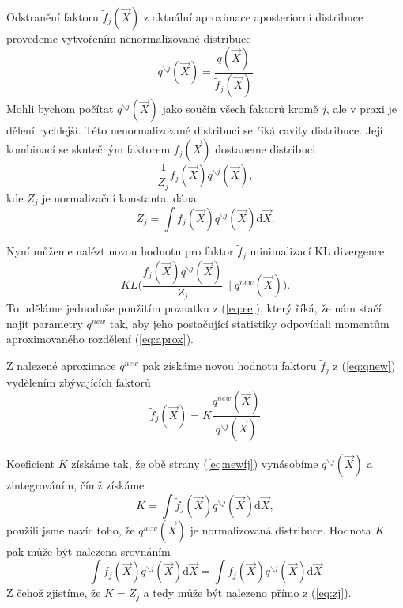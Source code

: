 Odstranění faktoru $\tilde{f}_j(\vec{X})$ z aktuální aproximace aposteriorní distribuce provedeme vytvořením nenormalizované distribuce
\begin{equation}
q^{\backslash j}(\vec{X}) = \frac{q(\vec{X})}{\tilde{f}_j(\vec{X})}
\end{equation}
Mohli bychom počítat $q^{\backslash j}(\vec{X})$ jako součin všech faktorů kromě $j$, ale v praxi je dělení rychlejší.
Této nenormalizované distribuci se říká cavity distribuce.
Její kombinací se skutečným faktorem $f_j(\vec{X})$ dostaneme distribuci
\begin{equation}
    \frac{1}{Z_j} f_j(\vec{X}) q^{\backslash j}(\vec{X}),
\label{eq:aprox}
\end{equation}
kde $Z_j$ je normalizační konstanta, dána
\begin{equation}
    Z_j = \int f_j(\vec{X}) q^{\backslash j}(\vec{X}) \mathrm{d}\vec{X}.
\label{eq:zj}
\end{equation}

Nyní můžeme nalézt novou hodnotu pro faktor $\tilde{f}_j$ minimalizací KL divergence
\begin{equation}
    KL\bigg(\frac{f_j(\vec{X}) q^{\backslash j}(\vec{X})}{Z_j} \bigg\| q^{new}(\vec{X})\bigg).
\end{equation}
To uděláme jednoduše použitím poznatku z (\ref{eq:ee}), který říká, že nám stačí najít parametry $q^{new}$ tak, aby jeho postačující statistiky odpovídali momentům aproximovaného rozdělení (\ref{eq:aprox}).

Z nalezené aproximace $q^{new}$ pak získáme novou hodnotu faktoru $\tilde{f}_j$ z (\ref{eq:qnew}) vydělením zbývajících faktorů
\begin{equation}
    \tilde{f}_j(\vec{X}) = K \frac{q^{new}(\vec{X})}{q^{\backslash j}(\vec{X})}
\label{eq:newfj}
\end{equation}

Koeficient $K$ získáme tak, že obě strany (\ref{eq:newfj}) vynásobíme $q^{\backslash j}(\vec{X})$ a zintegrováním, čímž získáme
\begin{equation}
    K = \int \tilde{f}_j(\vec{X}) q^{\backslash j}(\vec{X}) \mathrm{d}\vec{X},
\end{equation}
použili jsme navíc toho, že $q^{new}(\vec{X})$ je normalizovaná distribuce.
Hodnota $K$ pak může být nalezena srovnáním
\begin{equation}
    \int \tilde{f}_j (\vec{X}) q^{\backslash j}(\vec{X}) \mathrm{d}\vec{X} = \int f_j(\vec{X}) q^{\backslash j}(\vec{X}) \mathrm{d}\vec{X}
\end{equation}
Z čehož zjistíme, že $K = Z_j$ a tedy může být nalezeno přímo z (\ref{eq:zj}).

